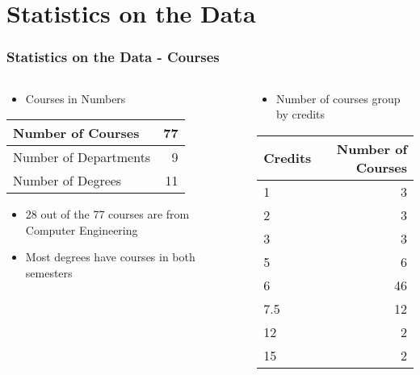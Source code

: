 \section{Statistics on the Data}

\begin{frame}
\frametitle{Statistics on the Data - Courses}

\begin{columns}[T] %
\begin{column}{.48\textwidth}
    \begin{itemize}
        \item Courses in Numbers
    \end{itemize}

    \begin{tabular}{| l | r |}
        \hline
        Number of Courses     & 77 \\ \hline
        Number of Departments & 9  \\ \hline
        Number of Degrees     & 11 \\ \hline
    \end{tabular}

    \vspace{1cm}

    \begin{itemize}
        \item 28 out of the 77 courses are from Computer Engineering
        \item Most degrees have courses in both semesters
    \end{itemize}
\end{column}%
\hfill%
\begin{column}{.48\textwidth}
    \begin{itemize}
        \item Number of courses group by credits
    \end{itemize}

    \begin{tabular}{| l | r |}
        \hline
        Credits & Number of Courses \\ \hline
        1       & 3                 \\ \hline
        2       & 3                 \\ \hline
        3       & 3                 \\ \hline
        5       & 6                 \\ \hline
        6       & 46                \\ \hline
        7.5     & 12                \\ \hline
        12      & 2                 \\ \hline
        15      & 2                 \\ \hline
    \end{tabular}
\end{column}%
\end{columns}
\end{frame}

